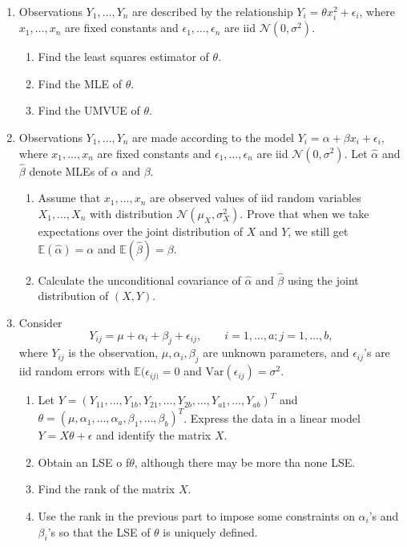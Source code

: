 \documentclass[12pt]{extarticle}
\begin{document}
\begin{enumerate}
	\item Observations $Y_1,\ldots,Y_n$ are described by the relationship $Y_i = \theta x_i^2 + \epsilon_i$, where $x_1,\ldots,x_n$ are fixed constants and $\epsilon_1,\ldots,\epsilon_n$ are iid $\mathcal N(0,\sigma^2)$.
	\begin{enumerate}
		\item Find the least squares estimator of $\theta$.
		\item Find the MLE of $\theta$.
		\item Find the UMVUE of $\theta$.
	\end{enumerate}
	
	\vspace{6cm}
	\item Observations $Y_1,\ldots,Y_n$ are made according to the model $Y_i = \alpha +\beta x_i+\epsilon_i$, where $x_1,\ldots,x_n$ are fixed constants and $\epsilon_1,\ldots,\epsilon_n$ are iid $\mathcal N(0,\sigma^2)$. Let $\hat \alpha$ and $\hat\beta$ denote MLEs of $\alpha$ and $\beta$.
	\begin{enumerate}
		\item Assume that $x_1,\ldots,x_n$ are observed values of iid random variables $X_1,\ldots,X_n$ with distribution $\mathcal N(\mu_X,\sigma^2_X)$. Prove that when we take expectations over the joint distribution of $X$ and $Y$, we still get $\mathbb E(\hat\alpha) = \alpha$ and $\mathbb E(\hat\beta) = \beta$.
		\item Calculate the unconditional covariance of $\hat \alpha$ and $\hat\beta$ using the joint distribution of $(X,Y)$.
	\end{enumerate}
	\newpage
	\item Consider $$Y_{ij} = \mu+\alpha_i+\beta_j+\epsilon_{ij}, \qquad i = 1,\ldots, a; j = 1,\ldots,b,$$
	where $Y_{ij}$ is the observation, $\mu,\alpha_i,\beta_j$ are unknown parameters, and $\epsilon_{ij}$'s are iid random errors with $\mathbb E(\epsilon_{ij)} = 0$ and $\text{Var}(\epsilon_{ij}) = \sigma^2$.
	\begin{enumerate}
		\item Let $Y = (Y_{11}, \ldots, Y_{1b},Y_{21},\ldots,Y_{2b},\ldots,Y_{a1},\ldots,Y_{ab})^T$ and $\theta = (\mu, \alpha_1,\ldots,\alpha_a,\beta_1,\ldots,\beta_b)^T$. Express the data in a linear model $Y = X\theta+\epsilon$ and identify the matrix $X$.
		\item Obtain an LSE o f$\theta$, although there may be more tha none LSE.
		\item Find the rank of the matrix $X$.
		\item Use the rank in the previous part to impose some constraints on $\alpha_i$'s and $\beta_i$'s so that the LSE of $\theta$ is uniquely defined.
	\end{enumerate}
	

\end{enumerate}
\end{document}
